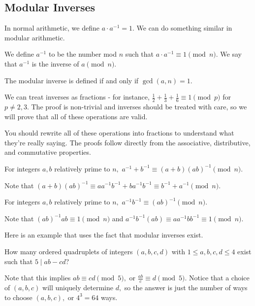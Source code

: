 \documentclass[mast]{lucky}
\begin{document}
\subsection{Modular Inverses}
In normal arithmetic, we define $a\cdot a^{-1}=1.$ We can do something similar in modular arithmetic.

\begin{defi}We define $a^{-1}$ to be the number mod $n$ such that $a\cdot a^{-1}\equiv 1 \pmod{n}.$ We say that $a^{-1}$ is the inverse of $a \pmod{n}.$\end{defi}

The modular inverse is defined if and only if $\gcd(a,n)=1.$

We can treat inverses as fractions - for instance, $\frac{1}{2}+\frac{1}{3}+\frac{1}{6}\equiv 1\pmod{p}$ for $p\neq 2,3.$ The proof is non-trivial and inverses should be treated with care, so we will prove that all of these operations are valid.

You should rewrite all of these operations into fractions to understand what they're really saying. The proofs follow directly from the associative, distributive, and commutative properties.

\begin{fact}
For integers $a,b$ relatively prime to $n,$ $a^{-1}+b^{-1}\equiv (a+b)(ab)^{-1}\pmod{n}.$
\end{fact}

\begin{pro}
Note that $(a+b)(ab)^{-1}\equiv aa^{-1}b^{-1}+ba^{-1}b^{-1}\equiv b^{-1}+a^{-1}\pmod{n}.$
\end{pro}

\begin{fact}
For integers $a,b$ relatively prime to $n,$ $a^{-1}b^{-1}\equiv(ab)^{-1}\pmod{n}.$
\end{fact}

\begin{pro}
Note that $(ab)^{-1}ab\equiv 1\pmod{n}$ and $a^{-1}b^{-1}(ab)\equiv aa^{-1}bb^{-1}\equiv 1\pmod{n}.$
\end{pro}

Here is an example that uses the fact that modular inverses exist.

\begin{exam}
How many ordered quadruplets of integers $(a,b,c,d)$ with $1\leq a,b,c,d\leq 4$ exist such that $5\mid ab-cd$?
\end{exam}

\begin{sol}
Note that this implies $ab\equiv cd\pmod{5},$ or $\frac{ab}{c}\equiv d\pmod{5}.$ Notice that a choice of $(a,b,c)$ will uniquely determine $d,$ so the answer is just the number of ways to choose $(a,b,c),$ or $4^3=64$ ways.
\end{sol}
\end{document}
